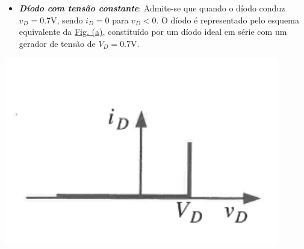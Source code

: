 \begin{center}
    \begin{minipage}{0.6\textwidth}
        \begin{itemize}[leftmargin=*]
        \item[] \textbf{\emph{Díodo com tensão constante}}: Admite-se que quando o díodo conduz $v_D = 0.7$V, sendo $i_D = 0$ para $v_D < 0$. O díodo é representado pelo esquema equivalente da \hyperref[fig:tensao-const-esquema]{Fig. (a)}, constituído por um díodo ideal em série com um gerador de tensão de $V_D = 0.7$V.
        \end{itemize}
    \end{minipage}%
    \hfill
    \begin{minipage}{0.4\textwidth}
        \begin{center}
            \includegraphics[width=0.9\textwidth]{img/2/tensao-const.png}
            \label{img:tesao-const}
        \end{center}
    \end{minipage}
\end{center}


